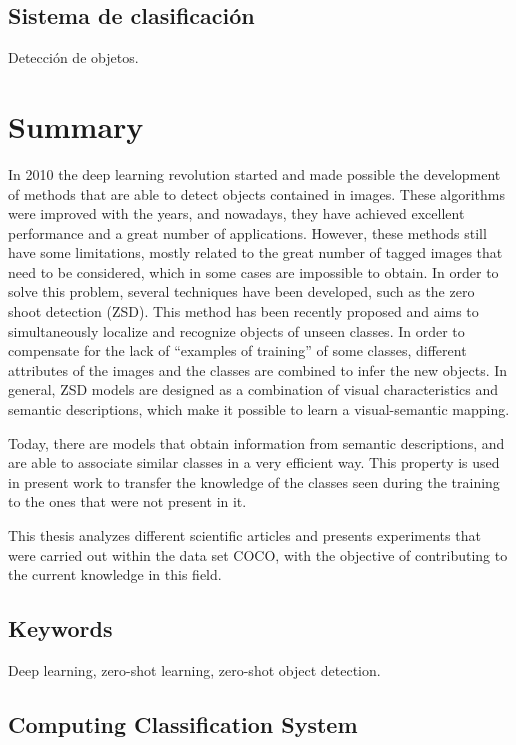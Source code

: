 \documentclass[12pt,twosided]{book}
\begin{document}
\section*{Sistema de clasificación} 

Detección de objetos.

\chapter*{Summary}

In 2010 the deep learning revolution started and made possible the development of methods that are able to detect objects contained in images. These algorithms were improved with the years, and nowadays, they have achieved excellent performance and a great number of applications. However, these methods still have some limitations, mostly related to the great number of tagged images that need to be considered, which in some cases are impossible to obtain. In order to solve this problem, several techniques have been developed, such as the zero shoot detection (ZSD). This method has been recently proposed and aims to simultaneously localize and recognize objects of unseen classes. In order to compensate for the lack of ``examples of training'' of some classes, different attributes of the images and the classes are combined to infer the new objects. In general, ZSD models are designed as a combination of visual characteristics and semantic descriptions, which make it possible to learn a visual-semantic mapping.

Today, there are models that obtain information from semantic descriptions, and are able to associate similar classes in a very efficient way. This property is used in present work to transfer the knowledge of the classes seen during the training to the ones that were not present in it.

This thesis analyzes different scientific articles and presents experiments that were carried out within the data set COCO, with the objective of contributing to the current knowledge in this field. 

\section*{Keywords}
Deep learning, zero-shot learning, zero-shot object detection.

\section*{Computing Classification System} 
\end{document}
